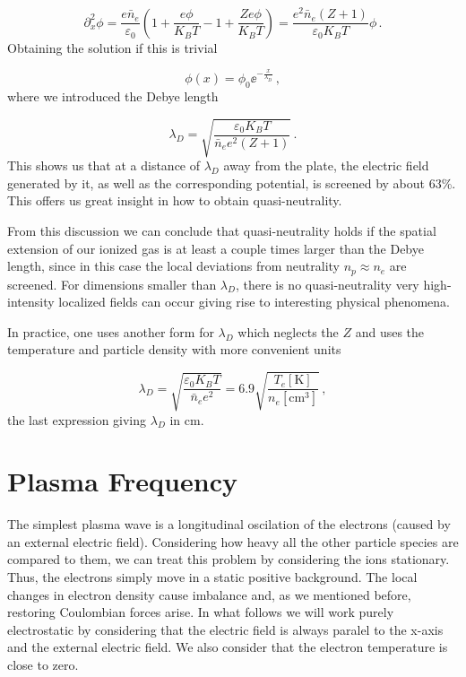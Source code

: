 \documentclass[12pt, class=report, crop=false]{standalone}
\begin{document}
\begin{equation}
  \partial_x^2 \phi = \frac{e \bar{n}_e}{\varepsilon_0} \left( 1 +\frac{e\phi}{K_B T} -1 + \frac{Ze\phi}{K_B T}\right) = \frac{e^2 \bar{n}_e (Z+1)}{\varepsilon_0 K_B T} \phi\,.
\end{equation}
Obtaining the solution if this is trivial

\begin{equation}
  \phi(x) = \phi_0 \ee^{-\frac{x}{\lambda_D}}\,,
\end{equation}
where we introduced the Debye length

\begin{equation}
  \lambda_D = \sqrt{\frac{\varepsilon_0 K_B T}{\bar{n}_e e^2 (Z+1)}}\,.
\end{equation}
This shows us that at a distance of \(\lambda_D\) away from the plate, the electric field generated by it, as well as the corresponding potential, is screened by about 63\%. This offers us great insight in how to obtain quasi-neutrality.

From this discussion we can conclude that quasi-neutrality holds if the spatial extension of our ionized gas is at least a couple times larger than the Debye length, since in this case the local deviations from neutrality \(n_p\approx n_e\) are screened. For dimensions smaller than \(\lambda_D\), there is no quasi-neutrality very high-intensity localized fields can occur giving rise to interesting physical phenomena.

In practice, one uses another form for \(\lambda_D\) which neglects the \(Z\) and uses the temperature and particle density with more convenient units

\begin{equation}
  \label{def:debye-length}
  \lambda_D = \sqrt{\frac{\varepsilon_0 K_B T}{\bar{n}_e e^2}} = 6.9 \sqrt{\frac{T_e [\textrm{K}]}{n_e [\textrm{cm}^3 ]}}\,,
\end{equation}
the last expression giving \(\lambda_D\) in cm.

\section{Plasma Frequency}

The simplest plasma wave is a longitudinal oscilation of the electrons (caused by an external electric field). Considering how heavy all the other particle species are compared to them, we can treat this problem by considering the ions stationary. Thus, the electrons simply move in a static positive background. The local changes in electron density cause imbalance and, as we mentioned before, restoring Coulombian forces arise. In what follows we will work purely electrostatic by considering that the electric field is always paralel to the x-axis and the external electric field. We also consider that the electron temperature is close to zero.
\end{document}
